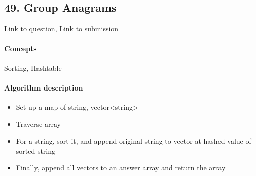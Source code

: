 \documentclass[11pt]{book}
\begin{document}
\subsection{49. Group Anagrams}
\href{https://leetcode.com/problems/group-anagrams/}{Link to question},
\href{https://leetcode.com/submissions/detail/335928725/}{Link to submission}
\paragraph{Concepts}
Sorting, Hashtable
\paragraph{Algorithm description}
\begin{itemize}
    \item Set up a map of string, vector<string>
    \item Traverse array
    \item For a string, sort it, and append original string to vector at hashed value of sorted string
    \item Finally, append all vectors to an answer array and return the array
\end{itemize}




\end{document}
